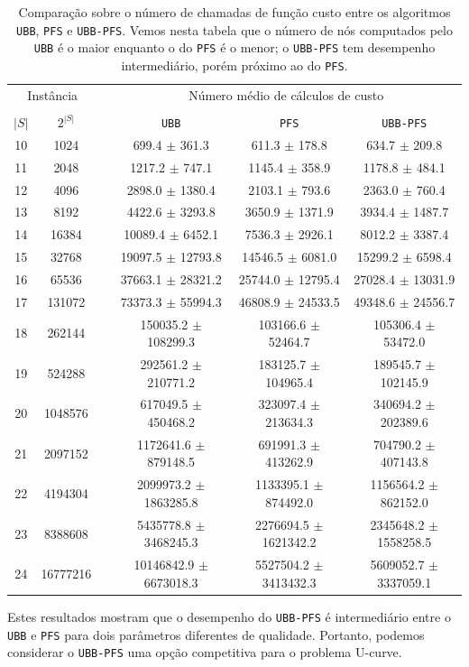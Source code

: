\documentclass[12pt]{article}
\newcommand{\algname}[1]{\texttt{#1}}
\begin{document}
\begin{table}
\centering
\footnotesize
\caption{Comparação sobre o número de chamadas de função custo entre
os algoritmos \algname{UBB}, \algname{PFS} e \algname{UBB-PFS}. Vemos
nesta tabela que o número de nós computados pelo \algname{UBB} é o maior
enquanto o do \algname{PFS} é o menor; o \algname{UBB-PFS} tem 
desempenho intermediário, porém próximo ao do \algname{PFS}.}
\label{tab:ubbpfs_vs_ubb_vs_pfs_computed_nodes}
\begin{tabular}{cc c ccc}
\toprule
\multicolumn{2}{c}{Instância} & \phantom{} & \multicolumn{3}{c}{Número médio de cálculos de custo}\\
\cline{1-2}\cline{4-6} \\
$|S|$ & $2^{|S|}$ && \algname{UBB} & \algname{PFS} & \algname{UBB-PFS}  \\
10 &    1024  && 699.4 $\pm$ 361.3 & 611.3 $\pm$ 178.8 & 634.7 $\pm$ 209.8 \\
11 &    2048  && 1217.2 $\pm$ 747.1 & 1145.4 $\pm$ 358.9 & 1178.8 $\pm$ 484.1 \\
12 &    4096  && 2898.0 $\pm$ 1380.4 & 2103.1 $\pm$ 793.6 & 2363.0 $\pm$ 760.4 \\
13 &    8192  && 4422.6 $\pm$ 3293.8 & 3650.9 $\pm$ 1371.9 & 3934.4 $\pm$ 1487.7 \\
14 &   16384  && 10089.4 $\pm$ 6452.1 & 7536.3 $\pm$ 2926.1 & 8012.2 $\pm$ 3387.4 \\
15 &   32768  && 19097.5 $\pm$ 12793.8 & 14546.5 $\pm$ 6081.0 & 15299.2 $\pm$ 6598.4 \\
16 &   65536  && 37663.1 $\pm$ 28321.2 & 25744.0 $\pm$ 12795.4 & 27028.4 $\pm$ 13031.9 \\
17 &  131072  && 73373.3 $\pm$ 55994.3 & 46808.9 $\pm$ 24533.5 & 49348.6 $\pm$ 24556.7 \\
18 &  262144  && 150035.2 $\pm$ 108299.3 & 103166.6 $\pm$ 52464.7 & 105306.4 $\pm$ 53472.0 \\
19 &  524288  && 292561.2 $\pm$ 210771.2 & 183125.7 $\pm$ 104965.4 & 189545.7 $\pm$ 102145.9 \\
20 & 1048576  && 617049.5 $\pm$ 450468.2 & 323097.4 $\pm$ 213634.3 & 340694.2 $\pm$ 202389.6 \\
21 & 2097152  && 1172641.6 $\pm$ 879148.5 & 691991.3 $\pm$ 413262.9 & 704790.2 $\pm$ 407143.8 \\
22 & 4194304  && 2099973.2 $\pm$ 1863285.8 & 1133395.1 $\pm$ 874492.0 & 1156564.2 $\pm$ 862152.0 \\
23 & 8388608  && 5435778.8 $\pm$ 3468245.3 & 2276694.5 $\pm$ 1621342.2 & 2345648.2 $\pm$ 1558258.5 \\
24 & 16777216 && 10146842.9 $\pm$ 6673018.3 & 5527504.2 $\pm$ 3413432.3 & 5609052.7 $\pm$ 3337059.1 \\
\bottomrule
\end{tabular}
\end{table}
Estes resultados mostram que o desempenho do \algname{UBB-PFS} é 
intermediário entre o \algname{UBB} e \algname{PFS} para dois parâmetros
diferentes de qualidade. Portanto, podemos considerar o 
\algname{UBB-PFS} uma opção competitiva para o problema U-curve.
\end{document}
